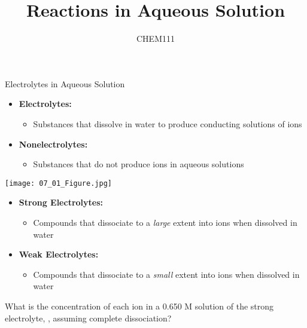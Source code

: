 \documentclass[handout]{beamer}
\title[Chapter 7.01-05]{Reactions in Aqueous Solution}
\author{CHEM111}
\begin{document}
\frame{\titlepage}

\begin{frame}[allowframebreaks]{Electrolytes in Aqueous Solution}
	\begin{itemize}
		\item \textbf{Electrolytes:}
			\begin{itemize}
				\item Substances that dissolve in water to
					produce conducting solutions of ions
					
					\begin{center}
					\end{center}
			\end{itemize}
		\item \textbf{Nonelectrolytes:}
			\begin{itemize}
				\item Substances that do not produce ions in
					aqueous solutions
					
					\begin{center}
					\end{center}
			\end{itemize}
	\end{itemize}

	\framebreak

	\begin{center}
		\texttt{[image: 07\_01\_Figure.jpg]}
	\end{center}

	\framebreak

	\begin{itemize}
		\item \textbf{Strong Electrolytes:}
			\begin{itemize}
				\item Compounds that dissociate to a
					\emph{large} extent into ions when
					dissolved in water
					
					\begin{center}
					\end{center}
			\end{itemize}
		\item \textbf{Weak Electrolytes:}
			\begin{itemize}
				\item Compounds that dissociate to a
					\emph{small} extent into ions when
					dissolved in water

					\begin{center}
					\end{center}
			\end{itemize}
	\end{itemize}

	\framebreak

	What is the concentration of each ion in a 0.650 M solution of the
	strong electrolyte, , assuming complete dissociation?

	\vfill
\end{frame}
\end{document}
